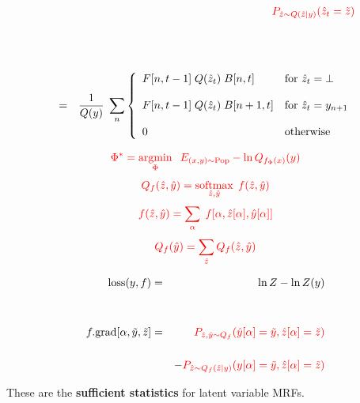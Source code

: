 {\begin{eqnarray*}
  & & {\color{red} P_{\hat{z} \sim Q(\hat{z}|y)}(\hat{z}_t = \tilde{z})} \\
  \\
  \\
  \\
  & = & \frac{1}{Q(y)}\;\sum_n \left\{\begin{array}{ll} F[n,t-1]\;Q(\hat{z}_t)\;B[n,t] & \mbox{for $\hat{z}_t = \bot$} \\
                                            \\
                                            F[n,t-1]\;Q(\hat{z}_t)\;B[n+1,t] & \mbox{for $\hat{z}_t = y_{n+1}$} \\
                                            \\
                                            0 & \mbox{otherwise} \end{array} \right.
\end{eqnarray*}


\bigskip
$${\color{red} \Phi^* = \operatorname*{argmin}_\Phi \;\;E_{(x,y) \sim \mathrm{Pop}}  -\ln Q_{f_\Phi(x)}(y)}$$
\bigskip
$${\color{red} Q_f(\hat{z},\hat{y})  = \operatorname*{softmax}_{\hat{z}, \hat{y}}\;f(\hat{z}, \hat{y})}$$
\bigskip
$${\color{red} f(\hat{z},\hat{y}) = \sum_\alpha  \; f[\alpha,\hat{z}[\alpha],\hat{y}[\alpha]]}$$
\bigskip
$${\color{red} Q_f(\hat{y}) = \sum_{\hat{z}} Q_f(\hat{z},\hat{y})}$$


\begin{eqnarray*}
  \mathrm{loss}(y,f) & = & \ln Z - \ln Z(y) \\
  \\
  \\
  f.\mathrm{grad}[\alpha,\tilde{y},\tilde{z}]
  & = & {\color{red} P_{\hat{z},\hat{y} \sim Q_f} (\hat{y}[\alpha] = \tilde{y},\hat{z}[\alpha] = \tilde{z})} \\
  \\
  & & - {\color{red} P_{\hat{z} \sim Q_f(\hat{z}|y)} (y[\alpha] = \tilde{y},\hat{z}[\alpha] = \tilde{z})}
\end{eqnarray*}

\vfill
These are the {\bf sufficient statistics} for latent variable MRFs.


}


